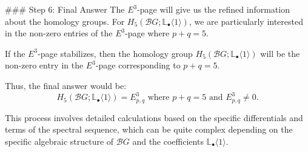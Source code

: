 ### Step 6: Final Answer
The \( E^3 \)-page will give us the refined information about the homology groups. For \( H_5(\mathcal{B}G; \mathbb{L}_\bullet\langle 1 \rangle) \), we are particularly interested in the non-zero entries of the \( E^3 \)-page where \( p + q = 5 \).

If the \( E^3 \)-page stabilizes, then the homology group \( H_5(\mathcal{B}G; \mathbb{L}_\bullet\langle 1 \rangle) \) will be the non-zero entry in the \( E^3 \)-page corresponding to \( p + q = 5 \).

Thus, the final answer would be:
\[ H_5(\mathcal{B}G; \mathbb{L}_\bullet\langle 1 \rangle) = E^3_{p,q} \text{ where } p + q = 5 \text{ and } E^3_{p,q} \neq 0. \]

This process involves detailed calculations based on the specific differentials and terms of the spectral sequence, which can be quite complex depending on the specific algebraic structure of \( \mathcal{B}G \) and the coefficients \( \mathbb{L}_\bullet\langle 1 \rangle \).